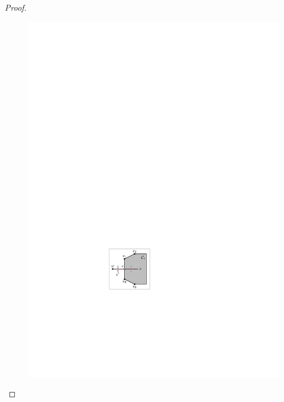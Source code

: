 \begin{proof}
\begin{figure}[t!]
\begin{minipage}[b]{.19\textwidth}
        \includegraphics[width=\textwidth,page=2]{images/3planar_polygon}
        \subcaption{~}\label{fig:cs2}
    \end{minipage}
	\begin{minipage}[b]{.19\textwidth}
        \centering

\end{minipage}
\end{figure}
\end{proof}

